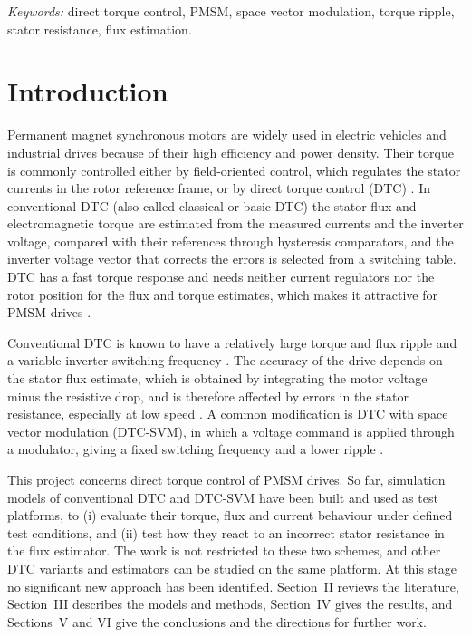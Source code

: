 \documentclass[12pt,a4paper,onecolumn]{IEEEtran}
\newif\iftoc \tocfalse         %
\begin{document}
\vspace{0.2cm}
\noindent\textit{Keywords:} direct torque control, PMSM, space vector modulation, torque ripple, stator resistance, flux estimation.

\iftoc\clearpage\tableofcontents\clearpage\fi

\section{Introduction}
Permanent magnet synchronous motors are widely used in electric vehicles and industrial drives because of their high efficiency and power density. Their torque is commonly controlled either by field-oriented control, which regulates the stator currents in the rotor reference frame, or by direct torque control (DTC) \cite{takahashi1986,depenbrock1988}. In conventional DTC (also called classical or basic DTC) the stator flux and electromagnetic torque are estimated from the measured currents and the inverter voltage, compared with their references through hysteresis comparators, and the inverter voltage vector that corrects the errors is selected from a switching table. DTC has a fast torque response and needs neither current regulators nor the rotor position for the flux and torque estimates, which makes it attractive for PMSM drives \cite{zhong1997,morales2018}.

Conventional DTC is known to have a relatively large torque and flux ripple and a variable inverter switching frequency \cite{buja2004}. The accuracy of the drive depends on the stator flux estimate, which is obtained by integrating the motor voltage minus the resistive drop, and is therefore affected by errors in the stator resistance, especially at low speed \cite{kadjoudj2007,haque2000}. A common modification is DTC with space vector modulation (DTC-SVM), in which a voltage command is applied through a modulator, giving a fixed switching frequency and a lower ripple \cite{habetler1992,tang2004}.

This project concerns direct torque control of PMSM drives. So far, simulation models of conventional DTC and DTC-SVM have been built and used as test platforms, to (i) evaluate their torque, flux and current behaviour under defined test conditions, and (ii) test how they react to an incorrect stator resistance in the flux estimator. The work is not restricted to these two schemes, and other DTC variants and estimators can be studied on the same platform. At this stage no significant new approach has been identified. Section~II reviews the literature, Section~III describes the models and methods, Section~IV gives the results, and Sections~V and VI give the conclusions and the directions for further work.
\end{document}

